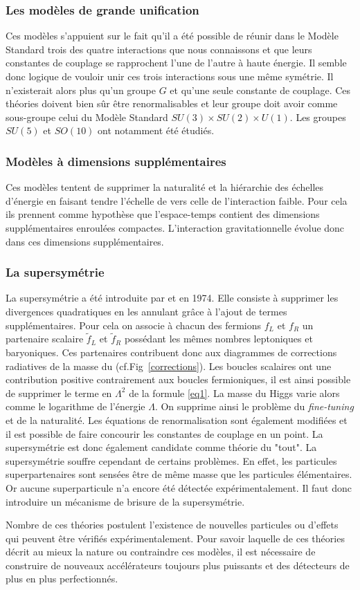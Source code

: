 \subsubsection{Les modèles de grande unification}
Ces modèles s'appuient sur le fait qu'il a été possible de réunir dans le Modèle Standard trois des quatre interactions que nous connaissons et que leurs constantes de couplage se rapprochent l'une de l'autre à haute énergie. Il semble donc logique de vouloir unir ces trois interactions sous une même symétrie. Il n'existerait alors plus qu'un groupe $G$ et qu'une seule constante de couplage. Ces théories doivent bien sûr être renormalisables et leur groupe doit avoir comme sous-groupe celui du Modèle Standard $SU(3)\times SU(2) \times U(1)$. Les groupes $SU(5)$ et $SO(10)$ ont notamment été étudiés.

\subsubsection{Modèles à dimensions supplémentaires}
Ces modèles tentent de supprimer la naturalité et la hiérarchie des échelles d'énergie en faisant tendre l'échelle de  vers celle de l'interaction faible. Pour cela ils prennent comme hypothèse que l'espace-temps contient des dimensions supplémentaires enroulées compactes. L'interaction gravitationnelle évolue donc dans ces dimensions supplémentaires.

\subsubsection{La supersymétrie}
La supersymétrie a été introduite par  et  en \num{1974}. Elle consiste à supprimer les divergences quadratiques en les annulant grâce à l'ajout de termes supplémentaires. Pour cela on associe à chacun des fermions $f_{L}$ et $f_{R}$ un partenaire scalaire $\tilde{f}_{L}$ et $\tilde{f}_{R}$ possédant les mêmes nombres leptoniques et baryoniques. Ces partenaires contribuent donc aux diagrammes de corrections radiatives de la masse du  (cf.Fig~\ref{corrections}). Les boucles scalaires ont une contribution positive contrairement aux boucles fermioniques, il est ainsi possible de supprimer le terme en $\Lambda^2$ de la formule \ref{eq1}. La masse du Higgs varie alors comme le logarithme de l'énergie $\Lambda$. On supprime ainsi le problème du \textit{fine-tuning} et de la naturalité. Les équations de renormalisation sont également modifiées et il est possible de faire concourir les constantes de couplage en un point. La supersymétrie est donc également candidate comme théorie du "tout". La supersymétrie souffre cependant de certains problèmes. En effet, les particules superpartenaires sont sensées être de même masse que les particules élémentaires. Or aucune superparticule n'a encore été détectée expérimentalement. Il faut donc introduire un mécanisme de brisure de la supersymétrie.

Nombre de ces théories postulent l'existence de nouvelles particules ou d'effets qui peuvent être vérifiés expérimentalement. Pour savoir laquelle de ces théories décrit au mieux la nature ou contraindre ces modèles, il est nécessaire de construire de nouveaux accélérateurs toujours plus puissants et des détecteurs de plus en plus perfectionnés. 
